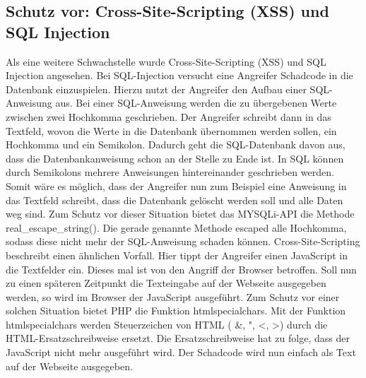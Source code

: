 \subsection{Schutz vor: Cross-Site-Scripting (XSS) und SQL Injection}
Als eine weitere Schwachstelle wurde Cross-Site-Scripting (XSS) und SQL Injection angesehen. Bei SQL-Injection versucht eine Angreifer Schadcode in die Datenbank einzuspielen. Hierzu nutzt der Angreifer den Aufbau einer SQL-Anweisung aus. Bei einer SQL-Anweisung werden die zu übergebenen Werte zwischen zwei Hochkomma geschrieben. Der Angreifer schreibt dann in das Textfeld, wovon die Werte in die Datenbank übernommen werden sollen, ein Hochkomma und ein Semikolon. Dadurch geht die SQL-Datenbank davon aus, dass die Datenbankanweisung schon an der Stelle zu Ende ist. In SQL können durch Semikolons mehrere Anweisungen hintereinander geschrieben werden. Somit wäre es möglich, dass der Angreifer nun zum Beispiel eine Anweisung in das Textfeld schreibt, dass die Datenbank gelöscht werden soll und alle Daten weg sind. Zum Schutz vor dieser Situation bietet das \glqq MYSQLi\grqq{}-API die Methode \glqq real\_escape\_string()\grqq{}. Die gerade genannte Methode \glqq escaped\grqq{} alle Hochkomma, sodass diese nicht mehr der SQL-Anweisung schaden können. Cross-Site-Scripting beschreibt einen ähnlichen Vorfall. Hier tippt der Angreifer einen JavaScript in die Textfelder ein. Dieses mal ist von den Angriff der Browser betroffen. Soll nun zu einen späteren Zeitpunkt die Texteingabe auf der Webseite ausgegeben werden, so wird im Browser der JavaScript ausgeführt. Zum Schutz vor einer solchen Situation bietet PHP die Funktion \glqq htmlspecialchars\grqq{}. Mit der Funktion \glqq htmlspecialchars\grqq{} werden Steuerzeichen von HTML ( \&, ", <, >) durch die HTML-Ersatzschreibweise ersetzt. Die Ersatzschreibweise hat zu folge, dass der JavaScript nicht mehr ausgeführt wird. Der \glqq Schadcode\grqq{} wird nun einfach als Text auf der Webseite ausgegeben. 